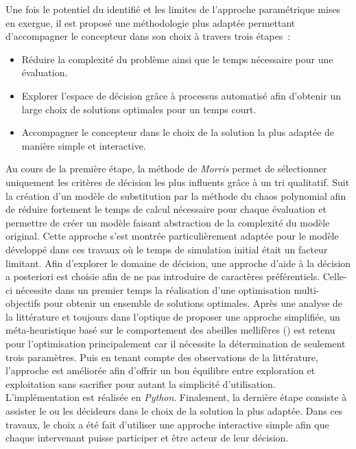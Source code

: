 Une fois le potentiel du  identifié et les limites de l’approche paramétrique
mises en exergue, il est proposé une méthodologie plus adaptée permettant d’accompagner
le concepteur dans son choix à travers trois étapes~:
\begin{itemize}
    \item Réduire la complexité du problème ainsi que le temps nécessaire pour une évaluation.
    \item Explorer l’espace de décision grâce à processus automatisé afin d’obtenir
          un large choix de solutions optimales pour un temps court.
    \item Accompagner le concepteur dans le choix de la solution la plus adaptée
          de manière simple et interactive.
\end{itemize}
Au cours de la première étape, la méthode de \textit{Morris} permet de sélectionner uniquement
les critères de décision les plus influents grâce à un tri qualitatif. Suit la création
d’un modèle de substitution par la méthode du chaos polynomial afin de réduire fortement le temps
de calcul nécessaire
pour chaque évaluation et permettre de créer un modèle faisant abstraction de la complexité du modèle original.
Cette approche s’est montrée particulièrement adaptée pour le
modèle développé dans ces travaux où le temps de simulation initial était un facteur
limitant. Afin d’explorer le domaine de décision, une approche d’aide à la décision a
posteriori est choisie afin de ne pas introduire de caractères préférentiels. Celle-ci
nécessite dans un premier temps la réalisation d’une optimisation multi-objectifs pour
obtenir un ensemble de solutions optimales. Après une analyse de la littérature et
toujours dans l’optique de proposer une approche simplifiée, un méta-heuristique basé sur
le comportement des abeilles mellifères () est retenu pour l’optimisation principalement car
il nécessite la détermination de seulement trois paramètres. Puis en tenant compte des observations
de la littérature, l’approche est améliorée afin d’offrir un bon équilibre entre exploration
et exploitation sans sacrifier pour autant la simplicité d’utilisation. L’implémentation est
réalisée en \textit{Python}.
Finalement, la dernière étape consiste à assister le ou les décideurs dans le choix de la
solution la plus adaptée. Dans ces travaux, le choix a été fait d’utiliser une approche
interactive simple afin que chaque intervenant puisse participer et être acteur de leur
décision.

